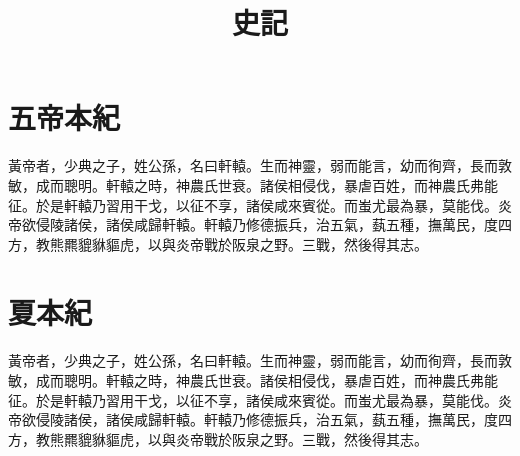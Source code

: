 \documentclass{ltc-guji}
\title{史記}
\begin{document}
\begin{正文}
\chapter{五帝本紀}
黃帝者，少典之子，姓公孫，名曰軒轅。生而神靈，弱而能言，幼而徇齊，長而敦敏，成而聰明。軒轅之時，神農氏世衰。諸侯相侵伐，暴虐百姓，而神農氏弗能征。於是軒轅乃習用干戈，以征不享，諸侯咸來賓從。而蚩尤最為暴，莫能伐。炎帝欲侵陵諸侯，諸侯咸歸軒轅。軒轅乃修德振兵，治五氣，蓺五種，撫萬民，度四方，教熊羆貔貅貙虎，以與炎帝戰於阪泉之野。三戰，然後得其志。
\clearpage
\chapter{夏本紀}
黃帝者，少典之子，姓公孫，名曰軒轅。生而神靈，弱而能言，幼而徇齊，長而敦敏，成而聰明。軒轅之時，神農氏世衰。諸侯相侵伐，暴虐百姓，而神農氏弗能征。於是軒轅乃習用干戈，以征不享，諸侯咸來賓從。而蚩尤最為暴，莫能伐。炎帝欲侵陵諸侯，諸侯咸歸軒轅。軒轅乃修德振兵，治五氣，蓺五種，撫萬民，度四方，教熊羆貔貅貙虎，以與炎帝戰於阪泉之野。三戰，然後得其志。
\end{正文}
\end{document}
